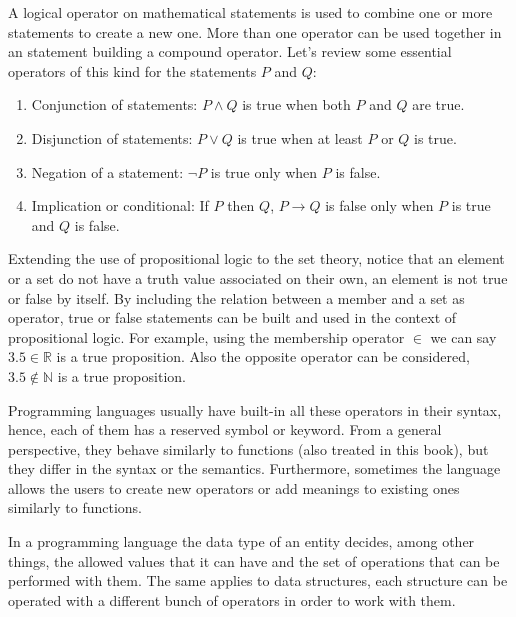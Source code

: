 A logical operator on mathematical statements is used to combine one or more statements to create a new one. 
More than one operator can be used together in an statement building a compound operator. 
Let's review some essential operators of this kind for the statements $P$ and $Q$:
\newpage
\begin{enumerate}[noitemsep]
    \item Conjunction of statements: $P \land Q$ is true when both $P$ and $Q$ are true.
    \item Disjunction of statements: $P\lor Q$ is true when at least $P$ or $Q$ is true.
    \item Negation of a statement: $\neg P$ is true only when $P$ is false.
    \item Implication or conditional: If $P$ then $Q$, $P\to Q$ is false only when $P$ is true and $Q$ is false. 
\end{enumerate}

Extending the use of propositional logic to the set theory, notice that an element or a set 
do not have a truth value associated on their own, an element is not true or false by itself. 
By including the relation between a member and a set as operator, true or false statements can be 
built and used in the context of propositional logic. 
For example, using the membership operator $\in$ we can say $3.5 \in \mathbb{R}$ is a true proposition. 
Also the opposite operator can be considered, $3.5 \notin \mathbb{N}$ is a true proposition.



Programming languages usually have built-in all these operators in their syntax,
hence, each of them has a reserved symbol or keyword.
From a general perspective, 
they behave similarly to functions (also treated in this book), 
but they differ in the syntax or the semantics. 
Furthermore, sometimes the language allows the users to create new operators 
or add meanings to existing ones similarly to functions. 

In a programming language the data type of an entity decides, among other things, 
the allowed values that it can have and 
the set of operations that can be performed with them.
The same applies to data structures, each structure can be operated 
with a different bunch of operators in order to work with them. 

%

